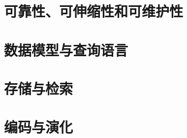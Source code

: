 \documentclass{book}
\begin{document}
\chapter{可靠性、可伸缩性和可维护性}
\label{ch:ch1}

\chapter{数据模型与查询语言}
\label{ch:ch2}
\chapter{存储与检索}
\label{ch:ch3}
\chapter{编码与演化}
\label{ch:ch4}
\end{document}
